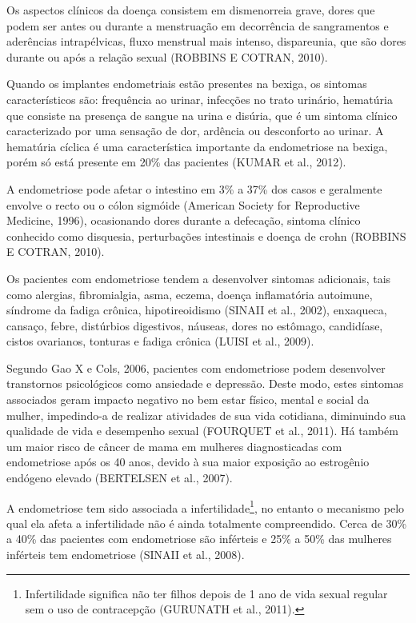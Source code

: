 \documentclass[12pt]{article} %
\begin{document}
Os aspectos clínicos da doença consistem em dismenorreia grave, dores que podem ser antes ou durante a menstruação em decorrência de sangramentos e aderências intrapélvicas, fluxo menstrual mais intenso,
dispareunia, que são dores durante ou após a relação sexual (ROBBINS E COTRAN, 2010).

Quando os implantes endometriais estão presentes na bexiga, os sintomas característicos são: frequência ao urinar, infecções no trato urinário, hematúria que consiste na presença de sangue na urina e disúria, que é um sintoma clínico caracterizado por uma sensação de dor, ardência ou desconforto ao urinar.  A hematúria cíclica é uma característica importante da endometriose na bexiga, porém só
está presente em 20\% das pacientes (KUMAR et al., 2012). 

A endometriose pode afetar o intestino em 3\% a 37\% dos
casos e geralmente envolve o recto ou o cólon sigmóide (American Society for Reproductive Medicine, 1996), ocasionando dores durante a defecação, sintoma clínico conhecido como disquesia, perturbações intestinais e doença de crohn (ROBBINS E COTRAN, 2010).

Os pacientes com endometriose tendem a desenvolver sintomas
adicionais, tais como alergias, fibromialgia, asma, eczema, doença
inflamatória autoimune, síndrome da fadiga crônica, hipotireoidismo
(SINAII et al., 2002), enxaqueca, cansaço, febre, distúrbios digestivos, náuseas, dores no estômago,
candidíase, cistos ovarianos, tonturas e fadiga crônica (LUISI et al., 2009).


Segundo Gao X e Cols, 2006, pacientes com endometriose podem
desenvolver transtornos psicológicos como ansiedade e depressão.
Deste modo, estes sintomas associados geram impacto negativo no bem estar físico, mental e social da mulher, impedindo-a de realizar
atividades de sua vida cotidiana, diminuindo sua qualidade de vida e
desempenho sexual (FOURQUET et al., 2011). Há também um maior risco de câncer de mama em mulheres diagnosticadas
com endometriose após os 40 anos, devido à sua maior exposição ao
estrogênio endógeno elevado (BERTELSEN et al., 2007).


A endometriose tem sido associada a infertilidade\footnote{Infertilidade significa não ter filhos depois de 1 ano de vida sexual regular sem o uso de contracepção (GURUNATH et al., 2011).}, no entanto o mecanismo pelo qual ela afeta a infertilidade não é ainda totalmente compreendido. Cerca de 30\% a 40\% das pacientes com endometriose são inférteis e 25\% a 50\% das mulheres inférteis tem endometriose (SINAII et al., 2008).
\end{document}

